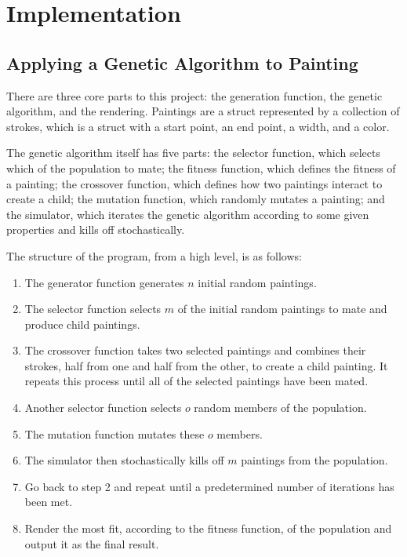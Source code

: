 \section{Implementation}

\subsection{Applying a Genetic Algorithm to Painting}
There are three core parts to this project: the generation function, the genetic algorithm, and the rendering. Paintings are a struct represented by a collection of strokes, which is a struct with a start point, an end point, a width, and a color. 

The genetic algorithm itself has five parts: the selector function, which selects which of the population to mate; the fitness function, which defines the fitness of a painting; the crossover function, which defines how two paintings interact to create a child; the mutation function, which randomly mutates a painting; and the simulator, which iterates the genetic algorithm according to some given properties and kills off stochastically.

The structure of the program, from a high level, is as follows:
\begin{enumerate}
    \item The generator function generates $n$ initial random paintings.
    \item The selector function selects $m$ of the initial random paintings to mate and produce child paintings.
    \item The crossover function takes two selected paintings and combines their strokes, half from one and half from the other, to create a child painting. It repeats this process until all of the selected paintings have been mated.
    \item Another selector function selects $o$ random members of the population.
    \item The mutation function mutates these $o$ members.
    \item The simulator then stochastically kills off $m$ paintings from the population.
    \item Go back to step 2 and repeat until a predetermined number of iterations has been met.
    \item Render the most fit, according to the fitness function, of the population and output it as the final result.
\end{enumerate}

